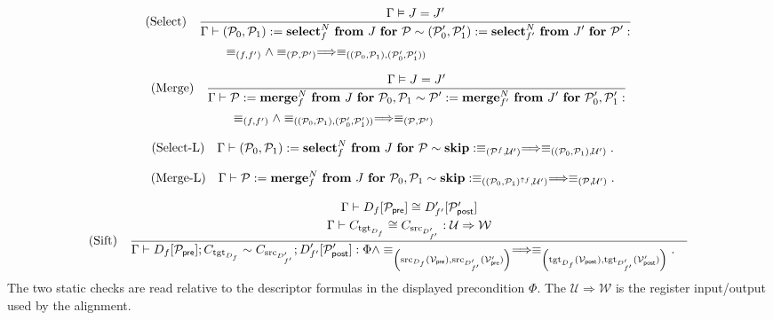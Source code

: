 \documentclass[acmsmall,screen,review,anonymous,nonacm]{acmart}
\theoremstyle{defn_style}
\begin{document}
\[
\text{\rm (Select)}
\quad
\frac{
\Gamma\vDash J=J'
}{
\begin{aligned}
\Gamma
\vdash\;&
(\mathcal P_0,\mathcal P_1)
:=
\mathbf{select}_{f}^{N}\ \mathbf{from}\ J\ \mathbf{for}\ \mathcal P
\sim
(\mathcal P'_0,\mathcal P'_1)
:=
\mathbf{select}_{f'}^{N}\ \mathbf{from}\ J'\ \mathbf{for}\ \mathcal P'
:
\\
&
\equiv_{(f,f')}\land\equiv_{(\mathcal P,\mathcal P')}
\Longrightarrow
\equiv_{((\mathcal P_0,\mathcal P_1),(\mathcal P'_0,\mathcal P'_1))}
\end{aligned}
}
\]

\[
\text{\rm (Merge)}
\quad
\frac{
\Gamma\vDash J=J'
}{
\begin{aligned}
\Gamma
\vdash\;&
\mathcal P
:=
\mathbf{merge}_{f}^{N}\ \mathbf{from}\ J\ \mathbf{for}\ \mathcal P_0,\mathcal P_1
\sim
\mathcal P'
:=
\mathbf{merge}_{f'}^{N}\ \mathbf{from}\ J'\ \mathbf{for}\ \mathcal P'_0,\mathcal P'_1
:
\\
&
\equiv_{(f,f')}\land\equiv_{((\mathcal P_0,\mathcal P_1),
          (\mathcal P'_0,\mathcal P'_1))}
\Longrightarrow
\equiv_{(\mathcal P,\mathcal P')}
\end{aligned}
}
\]

\[
\text{\rm (Select-L)}
\quad{
\begin{aligned}
\Gamma
\vdash\;&
(\mathcal P_0,\mathcal P_1)
:=
\mathbf{select}_{f}^{N}\ \mathbf{from}\ J\ \mathbf{for}\ \mathcal P
\sim
\mathbf{skip}
:
\equiv_{(\mathcal P^f,\mathcal U')}
\Longrightarrow
\equiv_{((\mathcal P_0,\mathcal P_1),\mathcal U')}.
\end{aligned}
}
\]

\[
\text{\rm (Merge-L)}
\quad
{
\begin{aligned}
\Gamma
\vdash\;&
\mathcal P
:=
\mathbf{merge}_{f}^{N}\ \mathbf{from}\ J\ \mathbf{for}\ \mathcal P_0,\mathcal P_1
\sim
\mathbf{skip}
:
\equiv_{((\mathcal P_0,\mathcal P_1)^{\uparrow f},\mathcal U')}
\Longrightarrow
\equiv_{(\mathcal P,\mathcal U')}.
\end{aligned}
}
\]

\[
\text{\rm (Sift)}
\quad
\frac{
\begin{array}{c}
\Gamma
\vdash
D_f[\mathcal P_{\mathsf{pre}}]
\cong
D'_{f'}[\mathcal P'_{\mathsf{post}}]
\\[0.6ex]
\Gamma
\vdash
C_{\operatorname{tgt}_{D_f}}
\cong
C_{\operatorname{src}_{D'_{f'}}}
:
\mathcal U
\Rightarrow
\mathcal W
\end{array}
}{
\begin{aligned}
\Gamma
\vdash\;&
D_f[\mathcal P_{\mathsf{pre}}];
C_{\operatorname{tgt}_{D_f}}
\sim
C_{\operatorname{src}_{D'_{f'}}};
D'_{f'}[\mathcal P'_{\mathsf{post}}]:
\Phi
\land
\equiv_{
\left(
\operatorname{src}_{D_f}(\mathcal V_{\mathsf{pre}}),
\operatorname{src}_{D'_{f'}}(\mathcal V'_{\mathsf{pre}})
\right)
}
\Longrightarrow
\equiv_{
\left(
\operatorname{tgt}_{D_f}(\mathcal V_{\mathsf{post}}),
\operatorname{tgt}_{D'_{f'}}(\mathcal V'_{\mathsf{post}})
\right)
}.
\end{aligned}
}
\]
The two static checks are read relative to the descriptor formulas in the
displayed precondition \(\Phi\). The \(\mathcal U\Rightarrow\mathcal W\) is the register input/output used
by the alignment.
\end{document}
